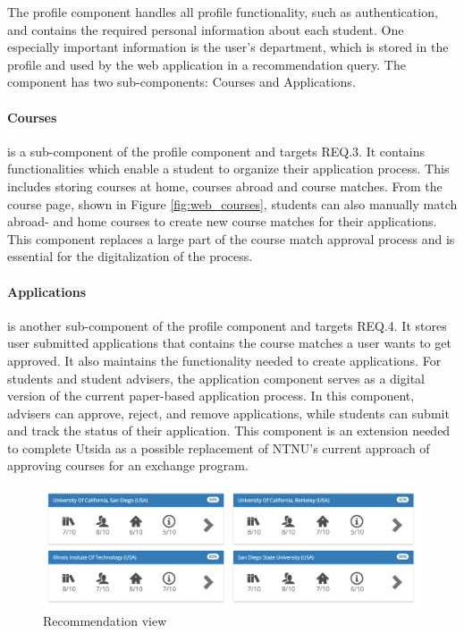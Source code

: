 The profile component handles all profile functionality, such as authentication, and contains the required personal information about each student. One especially important information is the user's department, which is stored in the profile and used by the web application in a recommendation query. The component has two sub-components: Courses and Applications.

\paragraph{Courses} 
is a sub-component of the profile component and targets REQ.3. It contains functionalities which enable a student to organize their application process. This includes storing courses at home, courses abroad and course matches. From the course page, shown in Figure \ref{fig:web_courses}, students can also manually match abroad- and home courses to create new course matches for their applications. This component replaces a large part of the course match approval process and is essential for the digitalization of the process.

\paragraph{Applications} 
is another sub-component of the profile component and targets REQ.4. It stores user submitted applications that contains the course matches a user wants to get approved. It also maintains the functionality needed to create applications. For students and student advisers, the application component serves as a digital version of the current paper-based application process. In this component, advisers can approve, reject, and remove applications, while students can submit and track the status of their application. This component is an extension needed to complete Utsida as a possible replacement of NTNU's current approach of approving courses for an exchange program.

\begin{figure}[h]
    \centering
    \includegraphics[width=1\textwidth]{fig/utsida_screenshots/result_1_cut_high.png}
    \caption{Recommendation view}
    \label{fig:web_results_1}
\end{figure}


